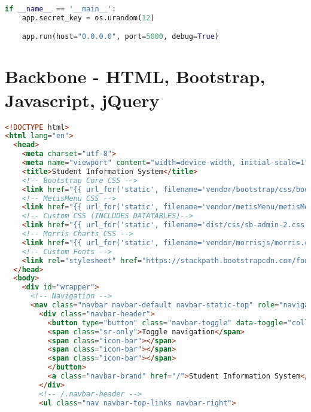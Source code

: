 \begin{lstlisting}[language=python]
if __name__ == '__main__':
    app.secret_key = os.urandom(12)

    app.run(host="0.0.0.0", port=5000, debug=True)

\end{lstlisting}

\section{Backbone - HTML, Bootstrap, Javascript, jQuery}

\begin{lstlisting}[language=HTML]
<!DOCTYPE html>
<html lang="en">
  <head>
    <meta charset="utf-8">
    <meta name="viewport" content="width=device-width, initial-scale=1">
    <title>Student Information System</title>
    <!-- Bootstrap Core CSS -->
    <link href="{{ url_for('static', filename='vendor/bootstrap/css/bootstrap.min.css') }}" rel="stylesheet">
    <!-- MetisMenu CSS -->
    <link href="{{ url_for('static', filename='vendor/metisMenu/metisMenu.min.css') }}" rel="stylesheet">
    <!-- Custom CSS (INCLUDES DATATABLES)-->
    <link href="{{ url_for('static', filename='dist/css/sb-admin-2.css') }}" rel="stylesheet">
    <!-- Morris Charts CSS -->
    <link href="{{ url_for('static', filename='vendor/morrisjs/morris.css') }}" rel="stylesheet">
    <!-- Custom Fonts -->
    <link rel="stylesheet" href="https://stackpath.bootstrapcdn.com/font-awesome/4.7.0/css/font-awesome.min.css">
  </head>
  <body>
    <div id="wrapper">
      <!-- Navigation -->
      <nav class="navbar navbar-default navbar-static-top" role="navigation" style="margin-bottom: 0">
        <div class="navbar-header">
          <button type="button" class="navbar-toggle" data-toggle="collapse" data-target=".navbar-collapse">
          <span class="sr-only">Toggle navigation</span>
          <span class="icon-bar"></span>
          <span class="icon-bar"></span>
          <span class="icon-bar"></span>
          </button>
          <a class="navbar-brand" href="/">Student Information System</a>
        </div>
        <!-- /.navbar-header -->
        <ul class="nav navbar-top-links navbar-right">
          

\end{lstlisting}
